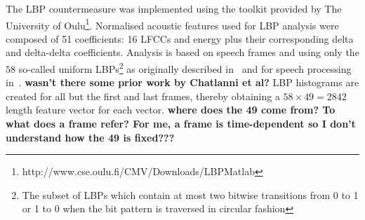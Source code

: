 

The LBP countermeasure was implemented using the toolkit provided by The University of Oulu\footnote{http://www.cse.oulu.fi/CMV/Downloads/LBPMatlab}.
Normalised acoustic features used for LBP analysis were composed of 51 coefficients: 16 LFCCs and energy plus their corresponding delta and delta-delta coefficients.  Analysis is based on speech frames and using only the $58$ so-called uniform LBPs\footnote{The subset of LBPs which contain at most two bitwise transitions from 0 to 1 or 1 to 0 when the bit pattern is traversed in circular fashion} as originally described in~\cite{Ojala2002} and for speech processing in~\cite{Alegre2013a}.  {\bfseries wasn't there some prior work by Chatlanni et al?}  LBP histograms are created for all but the first and last frames, thereby obtaining a $58 \times 49 = 2842$ length feature vector for each vector. {\bfseries where does the 49 come from?  To what does a frame refer?  For me, a frame is time-dependent so I don't understand how the 49 is fixed???}





